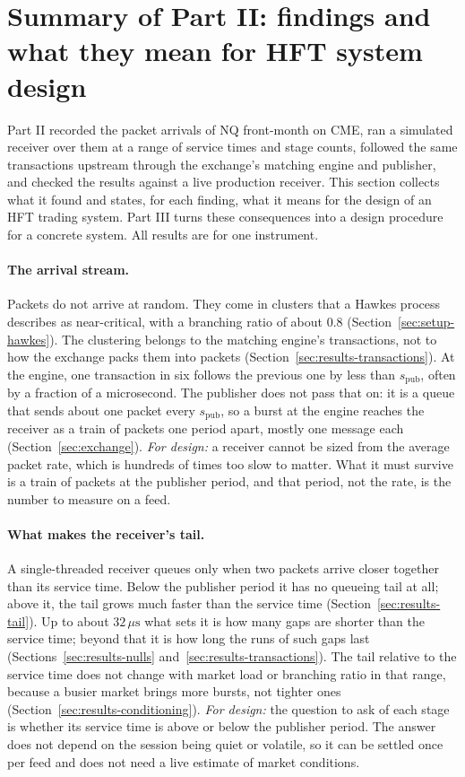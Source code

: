 \documentclass[11pt]{article}
\newcommand{\spub}{s_{\mathrm{pub}}}
\begin{document}

\section{Summary of Part II: findings and what they mean for HFT system design}
\label{sec:part2-summary}

Part II recorded the packet arrivals of NQ front-month on CME, ran a simulated receiver
over them at a range of service times and stage counts, followed the same transactions
upstream through the exchange's matching engine and publisher, and checked the results
against a live production receiver. This section collects what it found and states, for
each finding, what it means for the design of an HFT trading system. Part III turns these
consequences into a design procedure for a concrete system. All results are for one
instrument.

\paragraph{The arrival stream.} Packets do not arrive at random. They come in clusters
that a Hawkes process describes as near-critical, with a branching ratio of about $0.8$
(Section~\ref{sec:setup-hawkes}). The clustering belongs to the matching engine's
transactions, not to how the exchange packs them into packets
(Section~\ref{sec:results-transactions}). At the engine, one transaction in six follows the
previous one by less than $\spub$, often by a fraction of a microsecond. The
publisher does not pass that on: it is a queue that sends about one packet every
$\spub$, so a burst at the engine reaches the receiver as a train of packets one
period apart, mostly one message each (Section~\ref{sec:exchange}).
\emph{For design:} a receiver cannot be sized from the average packet rate, which is
hundreds of times too slow to matter. What it must survive is a train of packets at the
publisher period, and that period, not the rate, is the number to measure on a feed.

\paragraph{What makes the receiver's tail.} A single-threaded receiver queues only when
two packets arrive closer together than its service time. Below the publisher period it
has no queueing tail at all; above it, the tail grows much faster than the service time
(Section~\ref{sec:results-tail}). Up to about $32\,\mu\mathrm{s}$ what sets it is how many
gaps are shorter than the service time; beyond that it is how long the runs of such gaps
last (Sections~\ref{sec:results-nulls} and~\ref{sec:results-transactions}). The tail
relative to the service time does not change with market load or branching ratio in that
range, because a busier market brings more bursts, not tighter ones
(Section~\ref{sec:results-conditioning}). \emph{For design:} the question to ask of each
stage is whether its service time is above or below the publisher period. The answer does
not depend on the session being quiet or volatile, so it can be settled once per feed and
does not need a live estimate of market conditions.
\end{document}
